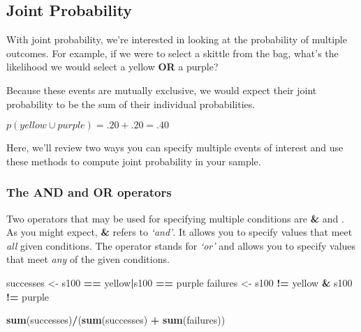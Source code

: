 \documentclass[
]{article}
\newenvironment{Shaded}{\begin{snugshade}}{\end{snugshade}}
\newcommand{\FunctionTok}[1]{\textcolor[rgb]{0.13,0.29,0.53}{\textbf{#1}}}
\newcommand{\NormalTok}[1]{#1}
\newcommand{\OtherTok}[1]{\textcolor[rgb]{0.56,0.35,0.01}{#1}}
\newcommand{\SpecialCharTok}[1]{\textcolor[rgb]{0.81,0.36,0.00}{\textbf{#1}}}
\newcommand{\StringTok}[1]{\textcolor[rgb]{0.31,0.60,0.02}{#1}}
\begin{document}
\hypertarget{joint-probability}{%
\subsection{Joint Probability}\label{joint-probability}}

With joint probability, we're interested in looking at the probability
of multiple outcomes. For example, if we were to select a skittle from
the bag, what's the likelihood we would select a yellow \textbf{OR} a
purple?

Because these events are mutually exclusive, we would expect their joint
probability to be the sum of their individual probabilities.

\(p(yellow\cup purple)=.20 + .20 = .40\)

Here, we'll review two ways you can specify multiple events of interest
and use these methods to compute joint probability in your sample.

\hypertarget{the-and-and-or-operators}{%
\subsubsection{The AND and OR
operators}\label{the-and-and-or-operators}}

Two operators that may be used for specifying multiple conditions are
\textbf{\&} and \textbf{\textbar{}}. As you might expect, \textbf{\&}
refers to \emph{`and'}. It allows you to specify values that meet
\emph{all} given conditions. The \textbf{\textbar{}} operator stands for
\emph{`or'} and allows you to specify values that meet \emph{any} of the
given conditions.

\begin{Shaded}
\begin{Highlighting}[]
\NormalTok{successes }\OtherTok{\textless{}{-}}\NormalTok{ s100 }\SpecialCharTok{==} \StringTok{\textquotesingle{}yellow\textquotesingle{}}\SpecialCharTok{|}\NormalTok{s100 }\SpecialCharTok{==} \StringTok{\textquotesingle{}purple\textquotesingle{}}
\NormalTok{failures }\OtherTok{\textless{}{-}}\NormalTok{ s100 }\SpecialCharTok{!=} \StringTok{\textquotesingle{}yellow\textquotesingle{}} \SpecialCharTok{\&}\NormalTok{ s100 }\SpecialCharTok{!=} \StringTok{\textquotesingle{}purple\textquotesingle{}}

\FunctionTok{sum}\NormalTok{(successes)}\SpecialCharTok{/}\NormalTok{(}\FunctionTok{sum}\NormalTok{(successes) }\SpecialCharTok{+} \FunctionTok{sum}\NormalTok{(failures))}
\end{Highlighting}
\end{Shaded}
\end{document}

